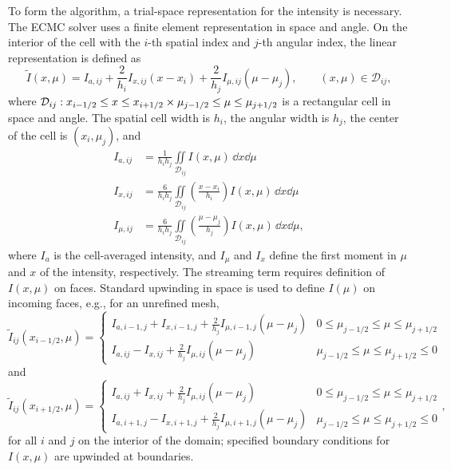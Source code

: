 To form the algorithm, a trial-space representation for the intensity is necessary.  The ECMC solver uses a finite element representation in space and angle. On the
interior of the cell with the $i$-th spatial index and $j$-th angular index, the linear representation is defined as
\begin{equation}\label{eq:ld_intens}
    \tilde I(x,\mu) = I_{a,ij} + \frac{2}{h_i}I_{x,ij}\left(x-x_i\right) +
    \frac{2}{h_j}I_{\mu,ij}\left(\mu-\mu_j\right), \quad \quad (x,\mu) \in
    \mathcal{D}_{ij},
\end{equation}
where $\mathcal{D}_{ij}: x_{{i-1/2}} \leq  x \leq  x_{{i+1/2}} \times \mu_{j-1/2} \leq \mu \leq \mu_{j+1/2}$
is a rectangular cell in space and angle.
The spatial cell width is $h_i$, the angular width is
$h_j$, the center of the cell is $(x_i,\mu_j)$, and
\begin{align}\label{eq:Imoms}
    I_{a,ij} &= \frac{1}{h_i h_j} \iint\limits_{\mathcal{D}_{ij}} I(x,\mu)\, \dd x \dd \mu \\
    I_{x,ij} &= \frac{6}{h_ih_j}\iint\limits_{\mathcal{D}_{ij}} \left(\frac{x - x_i}{h_{i}}\right)
    I(x,\mu)\, \dd x \dd \mu \\ \label{eq:Imoms2}
    I_{\mu,ij} &= \frac{6}{h_ih_j}\iint\limits_{\mathcal{D}_{ij}}
    \left(\frac{\mu - \mu_j}{h_{j}}\right)
    I(x,\mu)\, \dd x \dd \mu,
\end{align} 
where $I_a$ is the cell-averaged intensity, and $I_\mu$ and $I_x$ define the first
moment in $\mu$ and $x$ of the intensity, respectively.  The streaming term requires
definition of $I(x,\mu)$ on faces.  Standard upwinding in space is
used to define $I(\mu)$ on incoming faces, e.g., for an unrefined mesh,
\begin{equation}\label{eq:left_uw}
    \tilde{I}_{ij}(x_{i-1/2},\mu) = \left \{ \begin{array}{cl}
        I_{a,i-1,j}+I_{x,i-1,j}+\frac{2}{h_j}I_{\mu,i-1,j}\left(\mu-\mu_j\right) & 0 \leq \mu_{j-1/2} \leq \mu \leq \mu_{j+1/2} \\ 
I_{a,ij}-I_{x,ij}+\frac{2}{h_j}I_{\mu,ij}\left(\mu-\mu_j\right) &   \mu_{j-1/2} \leq \mu \leq \mu_{j+1/2} \leq 0
\end{array} \right.
\end{equation}
and
\begin{equation}\label{eq:right_uw}
    \tilde{I}_{ij}(x_{i+1/2},\mu) = \left \{ \begin{array}{cl}
I_{a,ij}+I_{x,ij}+\frac{2}{h_j}I_{\mu,ij}\left(\mu-\mu_j\right)
         & 0 \leq \mu_{j-1/2} \leq \mu \leq \mu_{j+1/2} \\ 
I_{a,i+1,j}-I_{x,i+1,j}+\frac{2}{h_j}I_{\mu,i+1,j}\left(\mu-\mu_j\right)
&   \mu_{j-1/2} \leq \mu \leq \mu_{j+1/2} \leq 0
\end{array} \right. ,
\end{equation}
for all $i$ and $j$ on the interior of the domain; specified boundary conditions for
$I(x,\mu)$ are upwinded at boundaries.
